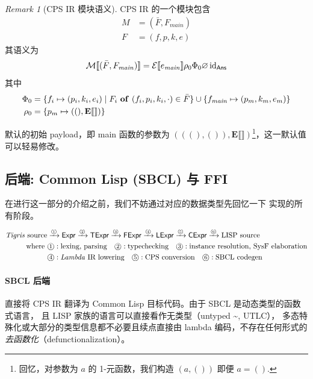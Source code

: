 \documentclass[a4paper, 11pt]{article}
\theoremstyle{remark}\newtheorem*{remark}{Remark}
\theoremstyle{definition}\newtheorem*{definition}{Definition}
\begin{document}
\begin{remark}[CPS IR 模块语义]
  CPS IR 的一个模块包含
  \begin{align*}
    M &= (\bar{F}, F_{\mathit{main}}) \\
    F &= (f, p, k, e)
  \end{align*}
  其语义为
  \[
    \mathcal{M}\llbracket (\bar{F}, F_{\mathit{main}}) \rrbracket =
    \mathcal{E}\llbracket e_{\mathit{main}} \rrbracket\rho_0\Phi_0\varnothing\,\mathrm{id}_\mathsf{Ans}
  \]
  其中
  \begin{align*}
    \FunTab_0 &= \{f_i \mapsto (p_i, k_i, e_i) \mid F_i\ \mathbf{of}\ (f_i, p_i, k_i, \cdot) \in \bar{F}\} \cup \{f_{\mathit{main}} \mapsto (p_m, k_m, e_m)\} \\
    \Env_0 &= \{p_m \mapsto (\unit, \mathbf{E}\llbracket\rrbracket)\}
  \end{align*}

  默认的初始 payload，即 main 函数的参数为 $(((), ()), \mathbf{E}\llbracket\rrbracket)$\footnote{
    回忆，对参数为 $a$ 的 1-元函数，我们构造 $(a, ())$ 即便 $a = ()$.
  }，这一默认值可以轻易修改。
\end{remark}

\subsection{后端: Common Lisp (SBCL) 与 FFI}\label{sect:ffi}
在进行这一部分的介绍之前，我们不妨通过对应的数据类型先回忆一下 \Tigris 实现的所有阶段。

\begin{align*}
  \text{\Tigris source}&
  \xrightarrow{\text{\textcircled{\tiny 1}}}\mathsf{Expr}
  \xrightarrow{\text{\textcircled{\tiny 2}}}\mathsf{TExpr}
  \xrightarrow{\text{\textcircled{\tiny 3}}}\mathsf{FExpr}
  \xrightarrow{\text{\textcircled{\tiny 4}}}\mathsf{LExpr}
  \xrightarrow{\text{\textcircled{\tiny 5}}}\mathsf{CExpr}
  \xrightarrow{\text{\textcircled{\tiny 6}}}\text{LISP source}\\
  \text{where}\
  &\text{\textcircled{\footnotesize 1}}:\text{lexing, parsing}
  \quad\text{\textcircled{\footnotesize 2}}:\text{typechecking}
  \quad\text{\textcircled{\footnotesize 3}}:\text{instance resolution, SysF elaboration}\\
  &\text{\textcircled{\footnotesize 4}}:\text{\Lambdair lowering}
  \quad\text{\textcircled{\footnotesize 5}}:\text{CPS conversion}
  \quad\text{\textcircled{\footnotesize 6}}:\text{SBCL codegen}
\end{align*}

\paragraph{SBCL 后端} 直接将 CPS IR 翻译为 Common Lisp 目标代码。由于 SBCL 是动态类型的函数式语言，
且 LISP 家族的语言可以直接看作无类型\lambdacalc（untyped \textasciitilde, UTLC），
多态特殊化或大部分的类型信息都不必要且续点直接由 lambda 编码，不存在任何形式的\emph{去函数化}（defunctionalization）。
\end{document}
